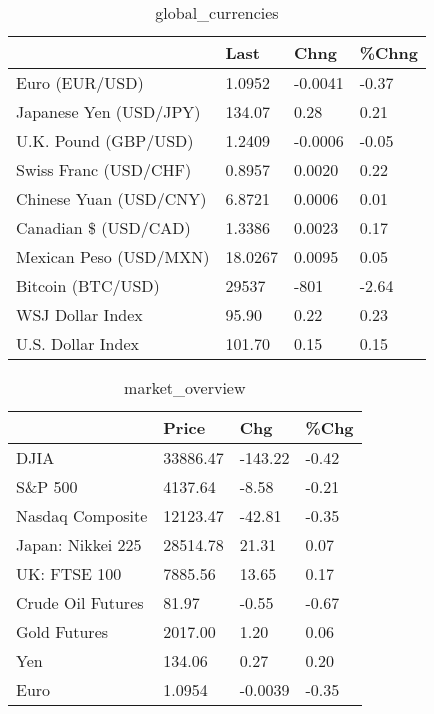 \documentclass{article}%
\begin{document}
%


\begin{table}[htbp]%
\caption{global\_currencies}%
\centering%
\begin{adjustbox}{width=1\textwidth}%
\begin{tabular}{llll}
\toprule
                       &    Last &    Chng & \%Chng \\
\midrule
        Euro (EUR/USD) &  1.0952 & -0.0041 & -0.37 \\
Japanese Yen (USD/JPY) &  134.07 &    0.28 &  0.21 \\
  U.K. Pound (GBP/USD) &  1.2409 & -0.0006 & -0.05 \\
 Swiss Franc (USD/CHF) &  0.8957 &  0.0020 &  0.22 \\
Chinese Yuan (USD/CNY) &  6.8721 &  0.0006 &  0.01 \\
  Canadian \$ (USD/CAD) &  1.3386 &  0.0023 &  0.17 \\
Mexican Peso (USD/MXN) & 18.0267 &  0.0095 &  0.05 \\
     Bitcoin (BTC/USD) &   29537 &    -801 & -2.64 \\
      WSJ Dollar Index &   95.90 &    0.22 &  0.23 \\
     U.S. Dollar Index &  101.70 &    0.15 &  0.15 \\
\bottomrule
\end{tabular}
%
\end{adjustbox}%
\end{table}

%


\begin{table}[htbp]%
\caption{market\_overview}%
\centering%
\begin{adjustbox}{width=1\textwidth}%
\begin{tabular}{llll}
\toprule
                  &    Price &     Chg &  \%Chg \\
\midrule
             DJIA & 33886.47 & -143.22 & -0.42 \\
          S\&P 500 &  4137.64 &   -8.58 & -0.21 \\
 Nasdaq Composite & 12123.47 &  -42.81 & -0.35 \\
Japan: Nikkei 225 & 28514.78 &   21.31 &  0.07 \\
     UK: FTSE 100 &  7885.56 &   13.65 &  0.17 \\
Crude Oil Futures &    81.97 &   -0.55 & -0.67 \\
     Gold Futures &  2017.00 &    1.20 &  0.06 \\
              Yen &   134.06 &    0.27 &  0.20 \\
             Euro &   1.0954 & -0.0039 & -0.35 \\
\bottomrule
\end{tabular}
%
\end{adjustbox}%
\end{table}

%
\end{document}
